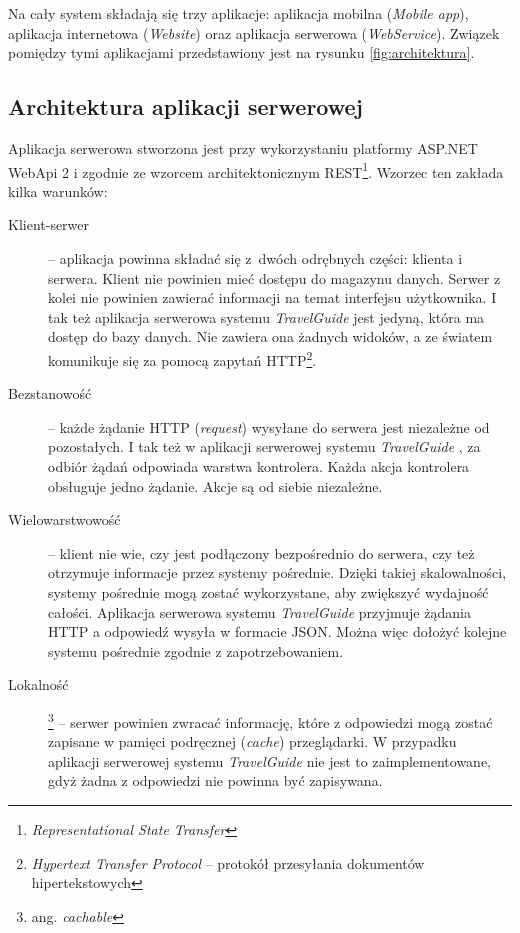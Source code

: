 \documentclass[a4paper]{book}
\newcommand{\appName}{\emph{TravelGuide} }
\begin{document}
		Na cały system składają się trzy aplikacje: aplikacja mobilna (\emph{Mobile app}), aplikacja internetowa (\emph{Website}) oraz aplikacja serwerowa (\emph{WebService}). Związek pomiędzy tymi aplikacjami przedstawiony jest na rysunku \ref{fig:architektura}. 
			
			\subsection{Architektura aplikacji serwerowej}
			
			
			
			Aplikacja serwerowa stworzona jest przy wykorzystaniu platformy ASP.NET WebApi 2 i zgodnie ze wzorcem architektonicznym REST\footnote{\emph{Representational State Transfer}}. Wzorzec ten zakłada kilka warunków:
			
			\begin{description}
				
				\item[Klient-serwer] -- aplikacja powinna składać się z~dwóch odrębnych części: klienta i serwera. Klient nie powinien mieć dostępu do magazynu danych. Serwer z kolei nie powinien zawierać informacji na temat interfejsu użytkownika. I tak też aplikacja serwerowa systemu \appName jest jedyną, która ma dostęp do bazy danych. Nie zawiera ona żadnych widoków, a ze światem 				komunikuje się za pomocą zapytań HTTP\footnote{\emph{Hypertext Transfer Protocol} – protokół przesyłania dokumentów hipertekstowych}.
				\item[Bezstanowość] -- każde żądanie HTTP (\emph{request}) wysyłane do serwera jest niezależne od pozostałych. I tak też w aplikacji serwerowej systemu \appName, za odbiór żądań odpowiada warstwa kontrolera. Każda akcja kontrolera obsługuje jedno żądanie. Akcje są od siebie niezależne.
				\item[Wielowarstwowość] -- klient nie wie, czy jest podłączony bezpośrednio do serwera, czy też otrzymuje informacje przez systemy pośrednie. Dzięki takiej skalowalności, systemy pośrednie mogą zostać wykorzystane, aby zwiększyć wydajność całości. Aplikacja serwerowa systemu \appName przyjmuje żądania HTTP a odpowiedź wysyła w formacie JSON. Można więc dołożyć kolejne systemu pośrednie zgodnie z zapotrzebowaniem. 
				\item[Lokalność]\footnote{ang. \textit{cachable}} -- serwer powinien zwracać informację, które z odpowiedzi mogą zostać zapisane w pamięci podręcznej (\emph{cache}) przeglądarki. W przypadku aplikacji serwerowej systemu \appName nie jest to zaimplementowane, gdyż żadna z odpowiedzi nie powinna być zapisywana.
				
			\end{description}
			
\end{document}
